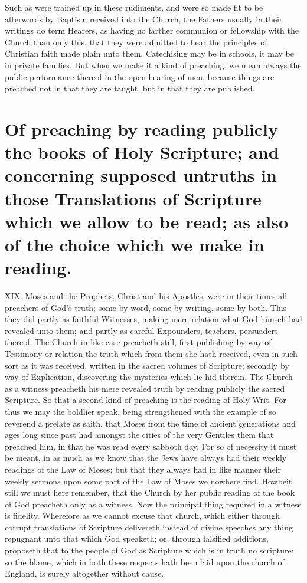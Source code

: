 Such as were trained up in these rudiments, and were so made fit to be afterwards by Baptism received into the Church,  the Fathers usually in their writings do term Hearers, as having no farther communion or fellowship with the Church than only this, that they were admitted to hear the principles of Christian faith made plain unto them.
Catechising may be in schools, it may be in private families. But when we make it a kind of preaching, we mean always the public performance thereof in the open hearing of men, because things are preached not in that they are taught, but in that they are published.

\section*{Of preaching by reading publicly the books of Holy Scripture; and concerning supposed untruths in those Translations of Scripture which we allow to be read; as also of the choice which we make in reading.}
XIX. Moses and the Prophets, Christ and his Apostles, were in their times all preachers of God’s truth; some by word, some by writing, some by both. This they did partly as faithful Witnesses, making mere relation what God himself had revealed unto them; and partly as careful Expounders, teachers, persuaders thereof. The Church in like case preacheth still, first publishing by way of Testimony or relation the truth which from them she hath received, even in such sort as it was received, written in the sacred volumes of Scripture; secondly by way of Explication, discovering the mysteries which lie hid therein. The Church as a witness preacheth his mere revealed truth by reading publicly the sacred Scripture. So that a second kind of preaching is the reading of Holy Writ.
For thus we may the boldlier speak, being strengthened with the example of so reverend a prelate as saith, that Moses from the time of ancient generations and ages long since past had amongst the cities of the very Gentiles them that preached him, in that he was read every sabboth day. For so of necessity it must be meant, in as much as we know that the Jews have always had their weekly readings of the Law of Moses; but that they always had in like manner their  weekly sermons upon some part of the Law of Moses we nowhere find.
Howbeit still we must here remember, that the Church by her public reading of the book of God preacheth only as a witness. Now the principal thing required in a witness is fidelity. Wherefore as we cannot excuse that church, which either through corrupt translations of Scripture delivereth instead of divine speeches any thing repugnant unto that which God speaketh; or, through falsified additions, proposeth that to the people of God as Scripture which is in truth no scripture: so the blame, which in both these respects hath been laid upon the church of England, is surely altogether without cause.

